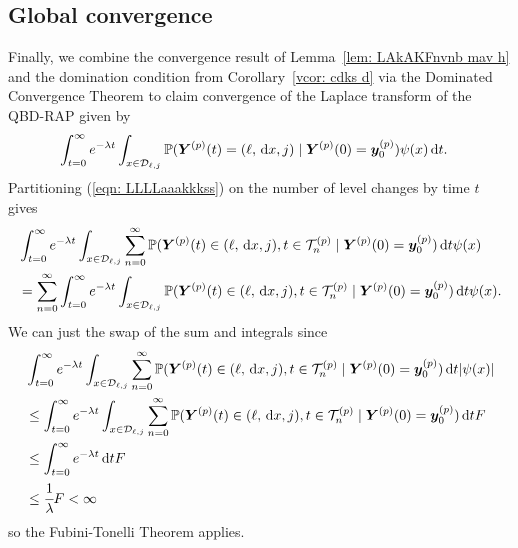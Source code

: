 \subsection{Global convergence}
Finally, we combine the convergence result of Lemma~\ref{lem: LAkAKFnvnb mav h} and the domination condition from Corollary~\ref{vcor: cdks d} via the Dominated Convergence Theorem to claim convergence of the Laplace transform of the QBD-RAP given by 
\begin{align}
	&\int_{t=0}^\infty e^{-\lambda t}\int_{x\in\mathcal D_{\ell,j}}\mathbb P( {\boldsymbol Y}^{(p)}(t) = (\ell,\, \mathrm{d} x,j)\mid \boldsymbol Y^{(p)}(0)=\boldsymbol y_0^{(p)})  \psi(x)\, \mathrm{d} t. \label{eqn: LLLLaaakkkss}
\end{align}
Partitioning (\ref{eqn: LLLLaaakkkss}) on the number of level changes by time \(t\) gives
\begin{align}
	& \int_{t=0}^\infty e^{-\lambda t}\int_{x\in\mathcal D_{\ell,j}}\sum_{n=0}^\infty \mathbb P(  {\boldsymbol Y}^{(p)}(t) \in (\ell, \, \mathrm{d} x, j), t\in\mathcal T_n^{(p)} \mid\nonumber 
	\boldsymbol Y^{(p)}(0)=\boldsymbol y_0^{(p)})\, \mathrm{d} t \psi(x) \nonumber
	\\&=\sum_{n=0}^\infty\int_{t=0}^\infty e^{-\lambda t}\int_{x\in\mathcal D_{\ell,j}} \mathbb P( {\boldsymbol Y}^{(p)}(t) \in (\ell, \, \mathrm{d} x, j), t\in\mathcal T_n^{(p)} \mid  
	\boldsymbol Y^{(p)}(0)=\boldsymbol y_0^{(p)})\, \mathrm{d} t \psi(x). \label{eqn: KLDNVnav}
\end{align}
We can just the swap of the sum and integrals since 
\begin{align}
	& \int_{t=0}^\infty e^{-\lambda t}\int_{x\in\mathcal D_{\ell,j}}\sum_{n=0}^\infty \mathbb P(  {\boldsymbol Y}^{(p)}(t) \in (\ell, \, \mathrm{d} x, j), t\in\mathcal T_n^{(p)} \mid\nonumber 
	\boldsymbol Y^{(p)}(0)=\boldsymbol y_0^{(p)})\, \mathrm{d} t |\psi(x)| \nonumber
	\\&\leq \int_{t=0}^\infty e^{-\lambda t}\int_{x\in\mathcal D_{\ell,j}}\sum_{n=0}^\infty \mathbb P(  {\boldsymbol Y}^{(p)}(t) \in (\ell, \, \mathrm{d} x, j), t\in\mathcal T_n^{(p)} \mid\nonumber 
	\boldsymbol Y^{(p)}(0)=\boldsymbol y_0^{(p)})\, \mathrm{d} t F \nonumber
	\\&\leq \int_{t=0}^\infty e^{-\lambda t}\, \mathrm{d} t F \nonumber
	\\&\leq \cfrac{1}{\lambda} F<\infty \nonumber
\end{align}
so the Fubini-Tonelli Theorem applies.

